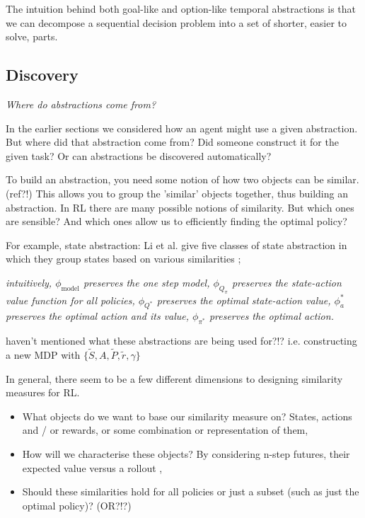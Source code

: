 The intuition behind both goal-like and option-like temporal abstractions is that
we can decompose a sequential decision problem into a set of shorter, easier to solve, parts.

\subsection{Discovery}

\begin{displayquote}
  \textit{Where do abstractions come from?}
\end{displayquote}

In the earlier sections we considered how an agent might use a given abstraction.
But where did that abstraction come from? Did someone construct it for the given task?
Or can abstractions be discovered automatically?

To build an abstraction, you need some notion of how two objects can be similar. (ref?!)
This allows you to group the 'similar' objects together, thus building an abstraction.
In RL there are many possible notions of similarity. But which ones are sensible?
And which ones allow us to efficiently finding the optimal policy?

\vspace{5mm}

For example, state abstraction: Li et al. \cite{Littman2006} give five classes of
state abstraction in which they group states based on various similarities \footnotemark[20];

\textit{intuitively,
$\phi_{\text{model}}$ preserves the one step model,
$\phi_{Q_{\pi}}$ preserves the state-action value function for all policies,
$\phi_{Q^{* }}$ preserves the optimal state-action value,
$\phi_a^{* }$ preserves the optimal action and its value,
$\phi_{\pi^{* }}$ preserves the optimal action.}

{\color{red}haven't mentioned what these abstractions are being used for?!?}
i.e. constructing a new MDP with $\{\tilde S, A, \tilde P, \tilde r, \gamma\}$

In general, there seem to be a few different dimensions to designing similarity measures for RL.

\begin{itemize}
  \tightlist
  \item What objects do we want to base our similarity measure on? States, actions and / or rewards, or some combination or representation of them,
  \item How will we characterise these objects? By considering n-step futures, their expected value versus a rollout \footnotemark[9],
  \item Should these similarities hold for all policies or just a subset (such as just the optimal policy)? (OR?!?)
\end{itemize}

